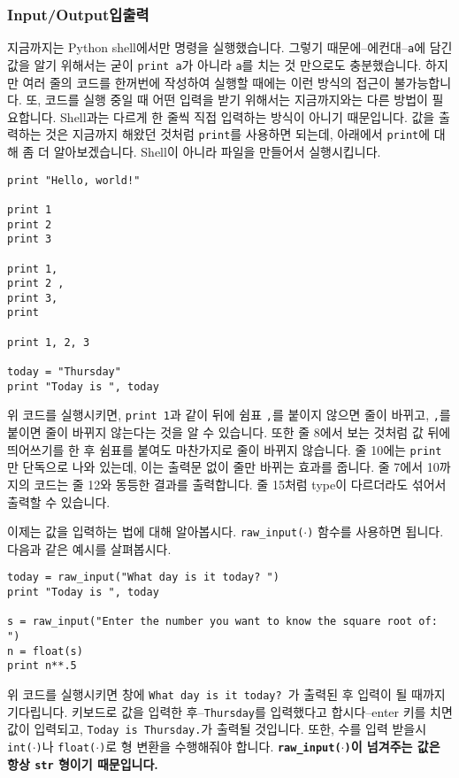 \documentclass[../main.tex]{subfiles}
\begin{document}
\subsubsection{Input/Output입출력}
지금까지는 Python shell에서만 명령을 실행했습니다.
그렇기 때문에--에컨대--\texttt{a}에 담긴 값을 알기 위해서는 굳이 \texttt{print a}가 아니라 \texttt{a}를 치는 것 만으로도 충분했습니다.
하지만 여러 줄의 코드를 한꺼번에 작성하여 실행할 때에는 이런 방식의 접근이 불가능합니다.
또, 코드를 실행 중일 때 어떤 입력을 받기 위해서는 지금까지와는 다른 방법이 필요합니다.
Shell과는 다르게 한 줄씩 직접 입력하는 방식이 아니기 때문입니다.
값을 출력하는 것은 지금까지 해왔던 것처럼 \texttt{print}를 사용하면 되는데, 아래에서 \texttt{print}에 대해 좀 더 알아보겠습니다.
Shell이 아니라 파일을 만들어서 실행시킵니다.
\begin{verbatim}
print "Hello, world!"

print 1
print 2
print 3

print 1,
print 2 ,
print 3,
print 

print 1, 2, 3

today = "Thursday"
print "Today is ", today
\end{verbatim}
위 코드를 실행시키면, \texttt{print 1}과 같이 뒤에 쉼표 \texttt{,}를 붙이지 않으면 줄이 바뀌고, \texttt{,}를 붙이면 줄이 바뀌지 않는다는 것을 알 수 있습니다.
또한 줄 8에서 보는 것처럼 값 뒤에 띄어쓰기를 한 후 쉼표를 붙여도 마찬가지로 줄이 바뀌지 않습니다.
줄 10에는 \texttt{print}만 단독으로 나와 있는데, 이는 출력문 없이 줄만 바뀌는 효과를 줍니다.
줄 7에서 10까지의 코드는 줄 12와 동등한 결과를 출력합니다.
줄 15처럼 type이 다르더라도 섞어서 출력할 수 있습니다.

이제는 값을 입력하는 법에 대해 알아봅시다.
\texttt{raw\_input($\cdot$)} 함수를 사용하면 됩니다.
다음과 같은 예시를 살펴봅시다.
\begin{verbatim}
today = raw_input("What day is it today? ")
print "Today is ", today

s = raw_input("Enter the number you want to know the square root of: ")
n = float(s)
print n**.5
\end{verbatim}
위 코드를 실행시키면 창에 \texttt{What day is it today? }가 출력된 후 입력이 될 때까지 기다립니다.
키보드로 값을 입력한 후--\texttt{Thursday}를 입력했다고 합시다--enter 키를 치면 값이 입력되고, \texttt{Today is Thursday.}가 출력될 것입니다.
또한, 수를 입력 받을시 \texttt{int($\cdot$)}나 \texttt{float($\cdot$)}로 형 변환을 수행해줘야 합니다.
\textbf{\texttt{raw\_input($\cdot$)}이 넘겨주는 값은 항상 \texttt{str} 형이기 때문입니다.}
\end{document}
